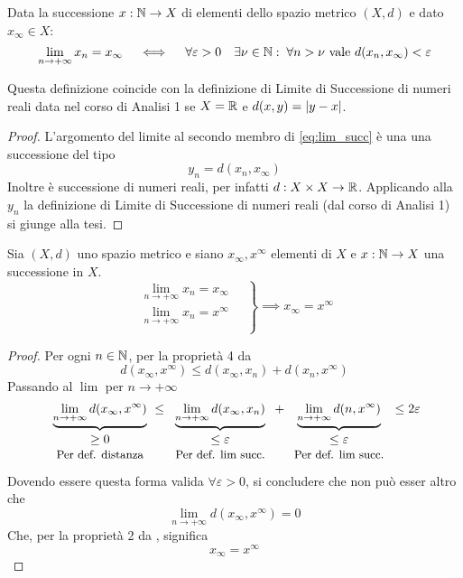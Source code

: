 \begin{proposition}
	\label{prop:succ_conv_lim}
	Data la successione $x: \mathbb{N} \to X$ di elementi dello spazio metrico $(X,d)$ e dato $x_\infty\in X$:
	\[\lim\limits_{n \to+\infty}x_n = x_\infty \quad \iff \quad \forall\varepsilon > 0 \quad \exists\nu\in\mathbb{N}:\; \forall n>\nu \text{ vale } d(x_n,x_\infty)<\varepsilon\]
	\vspace*{-\baselineskip}
	\begin{note}
		Questa definizione coincide con la definizione di Limite di Successione di numeri reali data nel corso di Analisi 1 se $X = \mathbb{R}$ e $d(x, y) = \left|y - x\right|$.
	\end{note}
	\begin{proof}
		L'argomento del limite al secondo membro di \cref{eq:lim_succ} è una una successione del tipo
		\[y_n = d(x_n,x_\infty)\]
		Inoltre è successione di numeri reali, per  infatti $d: X \times X \to \mathbb{R}$. Applicando alla $y_n$ la definizione di Limite di Successione di numeri reali (dal corso di Analisi 1) si giunge alla tesi.
	\end{proof}
\end{proposition}
\begin{theorem}
	Sia $(X,d)$ uno spazio metrico e siano $x_\infty, x^\infty$ elementi di $X$ e $x: \mathbb{N} \to X$ una successione in $X$.
	\begin{equation*}
		\left.
		\begin{array}{l}
			\lim\limits_{n \to +\infty} x_n = x_\infty\\
			\lim\limits_{n \to +\infty} x_n = x^\infty\\
		\end{array}
		\quad\right\}
		\implies x_\infty = x^\infty
	\end{equation*}
	\begin{proof}
		Per ogni $n \in \mathbb{N}$, per la proprietà 4 da 
		\[d(x_\infty, x^\infty) \leq d(x_\infty, x_n) + d(x_n, x^\infty)\]
		Passando al $\lim$ per $n \to +\infty$
		\[
			\underbrace{\lim\limits_{n \to +\infty}d(x_\infty, x^\infty)}_{\begin{tabular}{c}$\geq 0$\\{\small Per def. distanza}\end{tabular}}
			\leq
			\underbrace{\lim\limits_{n \to +\infty}d(x_\infty, x_n)}_{\begin{tabular}{c}$\leq \varepsilon$\\{\small Per def. lim succ.}\end{tabular}}
			+
			\underbrace{\lim\limits_{n \to +\infty}d(n, x^\infty)}_{\begin{tabular}{c}$\leq \varepsilon$\\{\small Per def. lim succ.}\end{tabular}}
			\leq 2 \varepsilon
		\]
		Dovendo essere questa forma valida $\forall \varepsilon > 0$, si concludere che non può esser altro che
		\[\lim\limits_{n \to +\infty}d(x_\infty, x^\infty) = 0\]
		Che, per la proprietà 2 da , significa
		\[x_\infty = x^\infty\]
	\end{proof}
\end{theorem}
